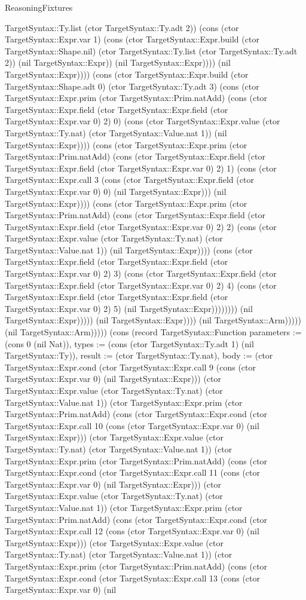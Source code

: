 \begin{lexlean}{ReasoningFixtures}
\begin{semanticmodule}
{TargetSyntax::Ty.list (ctor TargetSyntax::Ty.adt 2)) (cons (ctor TargetSyntax::Expr.var 1) (cons (ctor TargetSyntax::Expr.build (ctor TargetSyntax::Shape.nil) (ctor TargetSyntax::Ty.list (ctor TargetSyntax::Ty.adt 2)) (nil TargetSyntax::Expr)) (nil TargetSyntax::Expr)))) (nil TargetSyntax::Expr)))) (cons (ctor TargetSyntax::Expr.build (ctor TargetSyntax::Shape.adt 0) (ctor TargetSyntax::Ty.adt 3) (cons (ctor TargetSyntax::Expr.prim (ctor TargetSyntax::Prim.natAdd) (cons (ctor TargetSyntax::Expr.field (ctor TargetSyntax::Expr.field (ctor TargetSyntax::Expr.var 0) 2) 0) (cons (ctor TargetSyntax::Expr.value (ctor TargetSyntax::Ty.nat) (ctor TargetSyntax::Value.nat 1)) (nil TargetSyntax::Expr)))) (cons (ctor TargetSyntax::Expr.prim (ctor TargetSyntax::Prim.natAdd) (cons (ctor TargetSyntax::Expr.field (ctor TargetSyntax::Expr.field (ctor TargetSyntax::Expr.var 0) 2) 1) (cons (ctor TargetSyntax::Expr.call 3 (cons (ctor TargetSyntax::Expr.field (ctor TargetSyntax::Expr.var 0) 0) (nil TargetSyntax::Expr))) (nil TargetSyntax::Expr)))) (cons (ctor TargetSyntax::Expr.prim (ctor TargetSyntax::Prim.natAdd) (cons (ctor TargetSyntax::Expr.field (ctor TargetSyntax::Expr.field (ctor TargetSyntax::Expr.var 0) 2) 2) (cons (ctor TargetSyntax::Expr.value (ctor TargetSyntax::Ty.nat) (ctor TargetSyntax::Value.nat 1)) (nil TargetSyntax::Expr)))) (cons (ctor TargetSyntax::Expr.field (ctor TargetSyntax::Expr.field (ctor TargetSyntax::Expr.var 0) 2) 3) (cons (ctor TargetSyntax::Expr.field (ctor TargetSyntax::Expr.field (ctor TargetSyntax::Expr.var 0) 2) 4) (cons (ctor TargetSyntax::Expr.field (ctor TargetSyntax::Expr.field (ctor TargetSyntax::Expr.var 0) 2) 5) (nil TargetSyntax::Expr)))))))) (nil TargetSyntax::Expr))))) (nil TargetSyntax::Expr)))) (nil TargetSyntax::Arm))))) (nil TargetSyntax::Arm))))}) (cons (record TargetSyntax::Function {parameters := (cons 0 (nil Nat)), types := (cons (ctor TargetSyntax::Ty.adt 1) (nil TargetSyntax::Ty)), result := (ctor TargetSyntax::Ty.nat), body := (ctor TargetSyntax::Expr.cond (ctor TargetSyntax::Expr.call 9 (cons (ctor TargetSyntax::Expr.var 0) (nil TargetSyntax::Expr))) (ctor TargetSyntax::Expr.value (ctor TargetSyntax::Ty.nat) (ctor TargetSyntax::Value.nat 1)) (ctor TargetSyntax::Expr.prim (ctor TargetSyntax::Prim.natAdd) (cons (ctor TargetSyntax::Expr.cond (ctor TargetSyntax::Expr.call 10 (cons (ctor TargetSyntax::Expr.var 0) (nil TargetSyntax::Expr))) (ctor TargetSyntax::Expr.value (ctor TargetSyntax::Ty.nat) (ctor TargetSyntax::Value.nat 1)) (ctor TargetSyntax::Expr.prim (ctor TargetSyntax::Prim.natAdd) (cons (ctor TargetSyntax::Expr.cond (ctor TargetSyntax::Expr.call 11 (cons (ctor TargetSyntax::Expr.var 0) (nil TargetSyntax::Expr))) (ctor TargetSyntax::Expr.value (ctor TargetSyntax::Ty.nat) (ctor TargetSyntax::Value.nat 1)) (ctor TargetSyntax::Expr.prim (ctor TargetSyntax::Prim.natAdd) (cons (ctor TargetSyntax::Expr.cond (ctor TargetSyntax::Expr.call 12 (cons (ctor TargetSyntax::Expr.var 0) (nil TargetSyntax::Expr))) (ctor TargetSyntax::Expr.value (ctor TargetSyntax::Ty.nat) (ctor TargetSyntax::Value.nat 1)) (ctor TargetSyntax::Expr.prim (ctor TargetSyntax::Prim.natAdd) (cons (ctor TargetSyntax::Expr.cond (ctor TargetSyntax::Expr.call 13 (cons (ctor TargetSyntax::Expr.var 0) (nil }
\end{semanticmodule}
\end{lexlean}

